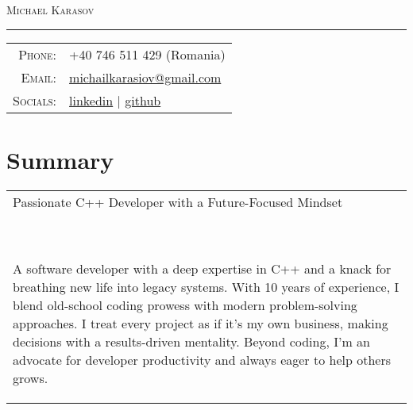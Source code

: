 \documentclass[a4paper,11pt]{article}
\begin{document}
\par{\centering
		{\Huge \textsc{Michael Karasov}
	}\bigskip\par}

\hrule
\vspace{0.5em}
\begin{tabular}{rl}
  \textsc{Phone:}     & +40 746 511 429 (Romania)\\
  \textsc{Email:}     & \href{mailto:michailkarasiov@gmail.com}{michailkarasiov@gmail.com}\\
  \textsc{Socials:}   & \faLinkedin{} \href{https://www.linkedin.com/in/michael-karasov-2731465a/}{linkedin}
  | \faGithub{} \href{https://github.com/MichaelKarasiov}{github}
\end{tabular}

\section{Summary}
\begin{tabular}{p{}}
Passionate C++ Developer with a Future-Focused Mindset\\\

A software developer with a deep expertise in C++ and a knack for breathing new life into legacy systems. With 10 years of experience, I blend old-school coding prowess with modern problem-solving approaches. I treat every project as if it's my own business, making decisions with a results-driven mentality. Beyond coding, I’m an advocate for developer productivity and always eager to help others grows.
\end{tabular}
\end{document}

